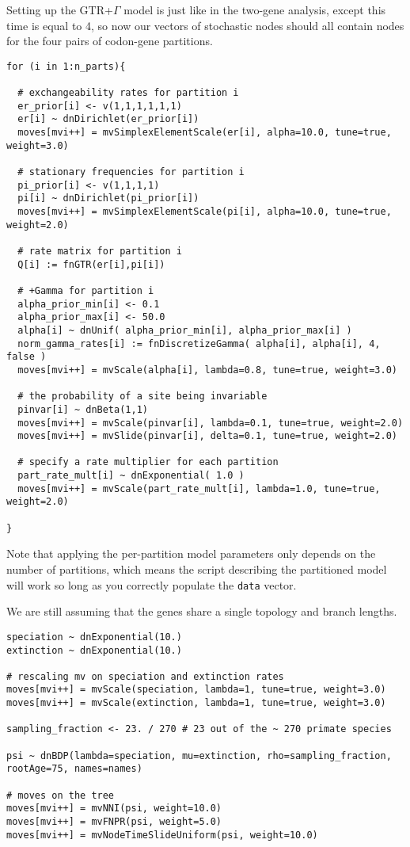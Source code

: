 Setting up the GTR+$\Gamma$ model is just like in the two-gene analysis, except this time  is equal to 4, so now our vectors of stochastic nodes should all contain nodes for the four pairs of codon-gene partitions.
{\tt \small \begin{snugshade*}
\begin{lstlisting}
for (i in 1:n_parts){

  # exchangeability rates for partition i
  er_prior[i] <- v(1,1,1,1,1,1)
  er[i] ~ dnDirichlet(er_prior[i])
  moves[mvi++] = mvSimplexElementScale(er[i], alpha=10.0, tune=true, weight=3.0)

  # stationary frequencies for partition i
  pi_prior[i] <- v(1,1,1,1)
  pi[i] ~ dnDirichlet(pi_prior[i])
  moves[mvi++] = mvSimplexElementScale(pi[i], alpha=10.0, tune=true, weight=2.0) 

  # rate matrix for partition i
  Q[i] := fnGTR(er[i],pi[i])

  # +Gamma for partition i
  alpha_prior_min[i] <- 0.1
  alpha_prior_max[i] <- 50.0
  alpha[i] ~ dnUnif( alpha_prior_min[i], alpha_prior_max[i] )
  norm_gamma_rates[i] := fnDiscretizeGamma( alpha[i], alpha[i], 4, false )
  moves[mvi++] = mvScale(alpha[i], lambda=0.8, tune=true, weight=3.0)

  # the probability of a site being invariable
  pinvar[i] ~ dnBeta(1,1)
  moves[mvi++] = mvScale(pinvar[i], lambda=0.1, tune=true, weight=2.0)
  moves[mvi++] = mvSlide(pinvar[i], delta=0.1, tune=true, weight=2.0)

  # specify a rate multiplier for each partition
  part_rate_mult[i] ~ dnExponential( 1.0 )
  moves[mvi++] = mvScale(part_rate_mult[i], lambda=1.0, tune=true, weight=2.0)

}
\end{lstlisting}
\end{snugshade*}}

Note that applying the per-partition model parameters only depends on the number of partitions, which means the script describing the partitioned model will work so long as you correctly populate the {\tt data} vector.

We are still assuming that the genes share a single topology and branch lengths.
{\tt \begin{snugshade*}
\begin{lstlisting}
speciation ~ dnExponential(10.)
extinction ~ dnExponential(10.)

# rescaling mv on speciation and extinction rates
moves[mvi++] = mvScale(speciation, lambda=1, tune=true, weight=3.0)
moves[mvi++] = mvScale(extinction, lambda=1, tune=true, weight=3.0)

sampling_fraction <- 23. / 270 # 23 out of the ~ 270 primate species

psi ~ dnBDP(lambda=speciation, mu=extinction, rho=sampling_fraction, rootAge=75, names=names)

# moves on the tree
moves[mvi++] = mvNNI(psi, weight=10.0)
moves[mvi++] = mvFNPR(psi, weight=5.0)
moves[mvi++] = mvNodeTimeSlideUniform(psi, weight=10.0)
\end{lstlisting}
\end{snugshade*}}

